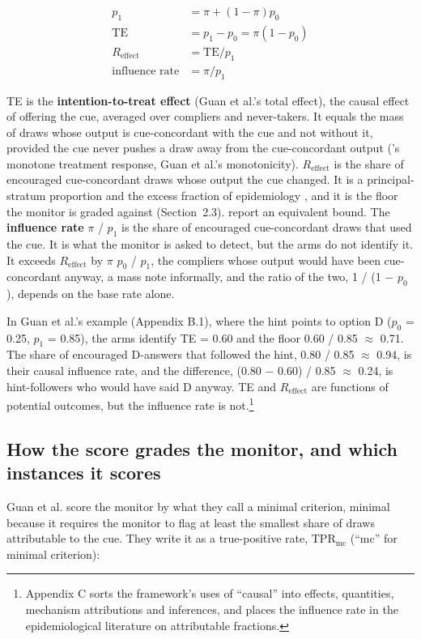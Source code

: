 \documentclass[11pt,a4paper]{article}
\begin{document}
\begin{align*}
  p_1 &= \pi  + (1 - \pi ) p_0 \\
  \mathrm{TE} &= p_1 - p_0 = \pi  (1 - p_0) \\
  R_{\mathrm{effect}} &= \mathrm{TE} / p_1 \\
  \text{influence rate} &= \pi  / p_1
\end{align*}

TE is the \textbf{intention-to-treat effect} (Guan et al.’s total effect), the causal effect of offering the cue, averaged over compliers and never-takers. It equals the mass of draws whose output is cue-concordant with the cue and not without it, provided the cue never pushes a draw away from the cue-concordant output (\citeauthor{manski1997monotone}’s \citeyear{manski1997monotone} monotone treatment response, Guan et al.’s monotonicity). $R_{\mathrm{effect}}$ is the share of encouraged cue-concordant draws whose output the cue changed. It is a principal-stratum proportion \citep{frangakis2002principal} and the excess fraction of epidemiology \citep{greenland1988conceptual}, and it is the floor the monitor is graded against (Section~2.3). \citet{burger2026cot} report an equivalent bound. The \textbf{influence rate} $\pi$ / $p_1$ is the share of encouraged cue-concordant draws that used the cue. It is what the monitor is asked to detect, but the arms do not identify it. It exceeds $R_{\mathrm{effect}}$ by $\pi$ $p_0$ / $p_1$, the compliers whose output would have been cue-concordant anyway, a mass \citet{dilgren2026evaluating} note informally, and the ratio of the two, 1 / (1 $-$ $p_0$), depends on the base rate alone.

In Guan et al.’s example (Appendix B.1), where the hint points to option D ($p_0$ = 0.25, $p_1$ = 0.85), the arms identify TE = 0.60 and the floor 0.60 / 0.85 $\approx$ 0.71. The share of encouraged D-answers that followed the hint, 0.80 / 0.85 $\approx$ 0.94, is their causal influence rate, and the difference, (0.80 $-$ 0.60) / 0.85 $\approx$ 0.24, is hint-followers who would have said D anyway. TE and $R_{\mathrm{effect}}$ are functions of potential outcomes, but the influence rate is not.\footnote{Appendix C sorts the framework’s uses of “causal” into effects, quantities, mechanism attributions and inferences, and places the influence rate in the epidemiological literature on attributable fractions.}

\subsection{How the score grades the monitor, and which instances it scores}
Guan et al. score the monitor by what they call a minimal criterion, minimal because it requires the monitor to flag at least the smallest share of draws attributable to the cue. They write it as a true-positive rate, $\mathrm{TPR}_{\mathrm{mc}}$ (“mc” for minimal criterion):
\end{document}
